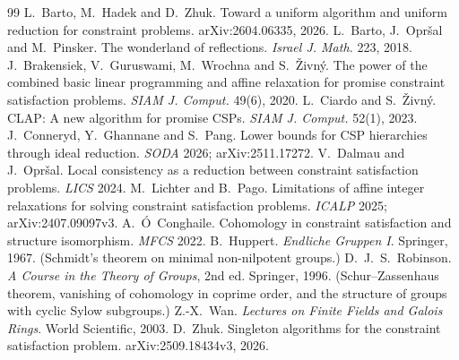 \documentclass[11pt]{article}
\theoremstyle{definition}
\theoremstyle{remark}
\begin{document}
\begin{thebibliography}{99}
 L.~Barto, M.~Hadek and D.~Zhuk. Toward a uniform algorithm and
uniform reduction for constraint problems. arXiv:2604.06335, 2026.
 L.~Barto, J.~Opr\v{s}al and M.~Pinsker. The wonderland of
reflections. \emph{Israel J. Math.} 223, 2018.
 J.~Brakensiek, V.~Guruswami, M.~Wrochna and S.~\v{Z}ivn\'y. The
power of the combined basic linear programming and affine relaxation for promise
constraint satisfaction problems. \emph{SIAM J. Comput.} 49(6), 2020.
 L.~Ciardo and S.~\v{Z}ivn\'y. CLAP: A new algorithm for promise
CSPs. \emph{SIAM J. Comput.} 52(1), 2023.
 J.~Conneryd, Y.~Ghannane and S.~Pang. Lower bounds for CSP
hierarchies through ideal reduction. \emph{SODA} 2026; arXiv:2511.17272.
 V.~Dalmau and J.~Opr\v{s}al. Local consistency as a reduction
between constraint satisfaction problems. \emph{LICS} 2024.
 M.~Lichter and B.~Pago. Limitations of affine integer relaxations
for solving constraint satisfaction problems. \emph{ICALP} 2025;
arXiv:2407.09097v3.
 A.~\'O~Conghaile. Cohomology in constraint satisfaction and
structure isomorphism. \emph{MFCS} 2022.
 B.~Huppert. \emph{Endliche Gruppen I}. Springer, 1967. (Schmidt's
theorem on minimal non-nilpotent groups.)
 D.~J.~S.~Robinson. \emph{A Course in the Theory of Groups}, 2nd
ed. Springer, 1996. (Schur--Zassenhaus theorem, vanishing of cohomology in
coprime order, and the structure of groups with cyclic Sylow subgroups.)
 Z.-X.~Wan. \emph{Lectures on Finite Fields and Galois Rings}.
World Scientific, 2003.
 D.~Zhuk. Singleton algorithms for the constraint satisfaction
problem. arXiv:2509.18434v3, 2026.
\end{thebibliography}
\end{document}
